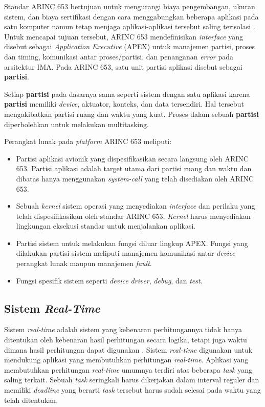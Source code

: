 Standar ARINC 653 bertujuan untuk mengurangi biaya pengembangan, ukuran sistem, dan biaya sertifikasi dengan cara menggabungkan beberapa aplikasi pada satu komputer namun tetap menjaga aplikasi-aplikasi tersebut saling terisolasi \citep[pp.~3-30]{AirlinesElectronicEngineeringCommittee2012}.
Untuk mencapai tujuan tersebut, ARINC 653 mendefinisikan \textit{interface} yang disebut sebagai \textit{Application Executive} (APEX) untuk manajemen partisi, proses dan timing, komunikasi antar proses/partisi, dan penanganan \textit{error} pada arsitektur IMA.
Pada ARINC 653, satu unit partisi aplikasi disebut sebagai \textbf{partisi}.

Setiap \textbf{partisi} pada dasarnya sama seperti sistem dengan satu aplikasi karena \textbf{partisi} memiliki \textit{device}, aktuator, konteks, dan data tersendiri.
Hal tersebut mengakibatkan partisi ruang dan waktu yang kuat.
Proses dalam sebuah \textbf{partisi} diperbolehkan untuk melakukan multitasking.

Perangkat lunak pada \textit{platform} ARINC 653 meliputi:
\begin{itemize}
    \item Partisi aplikasi avionik yang dispesifikasikan secara langsung oleh ARINC 653. Partisi aplikasi adalah target utama dari partisi ruang dan waktu dan dibatas hanya menggunakan \textit{system-call} yang telah disediakan oleh ARINC 653.
    \item Sebuah \textit{kernel} sistem operasi yang menyediakan \textit{interface} dan perilaku yang telah dispesifikasikan oleh standar ARINC 653. \textit{Kernel} harus menyediakan lingkungan eksekusi standar untuk menjalankan aplikasi.
    \item Partisi sistem untuk melakukan fungsi diluar lingkup APEX. Fungsi yang dilakukan partisi sistem meliputi manajemen komunikasi antar \textit{device} perangkat lunak maupun manajemen \textit{fault}.
    \item Fungsi spesifik sistem seperti \textit{device driver}, \textit{debug}, dan \textit{test}.
\end{itemize}

\subsection{Sistem \textit{Real-Time}}

Sistem \textit{real-time} adalah sistem yang kebenaran perhitungannya tidak hanya ditentukan oleh kebenaran hasil perhitungan secara logika, tetapi juga waktu dimana hasil perhitungan dapat digunakan \citep[pp.~6-7]{Shin1994}.
Sistem \textit{real-time} digunakan untuk mendukung aplikasi yang membutuhkan perhitungan \textit{real-time}.
Aplikasi yang membutuhkan perhitungan \textit{real-time} umumnya terdiri atas beberapa \textit{task} yang saling terkait.
Sebuah \textit{task} seringkali harus dikerjakan dalam interval reguler dan memiliki \textit{deadline} yang berarti \textit{task} tersebut harus sudah selesai pada waktu yang telah ditentukan.

